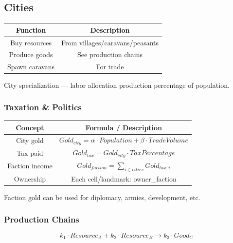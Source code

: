\subsection{Cities}

\begin{table}[H]
\centering
\begin{tabular}{|c|c|}
\hline
Function & Description \\
\hline
Buy resources & From villages/caravans/peasants \\
Produce goods & See production chains \\
Spawn caravans & For trade \\
\hline
\end{tabular}
\end{table}

City specialization — labor allocation production percentage of population.



\subsubsection{Taxation \& Politics}

\begin{table}[H]
\centering
\begin{tabular}{|c|c|}
\hline
Concept & Formula / Description \\
\hline
City gold & $Gold_{city} = \alpha \cdot Population + \beta \cdot TradeVolume$ \\
Tax paid & $Gold_{tax} = Gold_{city} \cdot TaxPercentage$ \\
Faction income & $Gold_{faction} = \sum_{i \in cities} Gold_{tax,i}$ \\
Ownership & Each cell/landmark: owner\_faction \\
\hline
\end{tabular}
\end{table}

Faction gold can be used for diplomacy, armies, development, etc.



\subsubsection{Production Chains}

\begin{equation}
k_1 \cdot Resource_A + k_2 \cdot Resource_B 
\rightarrow 
k_3 \cdot Good_C
\end{equation}

